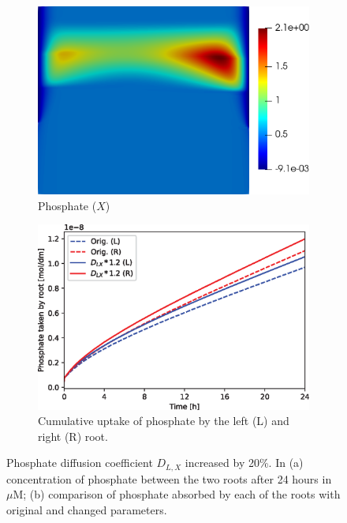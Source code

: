 \documentclass[11pt]{article}
\numberwithin{equation}{section}
\begin{document}
\begin{figure}[!htb]
\centering
\begin{subfigure}[t]{0.35\textwidth}
    \includegraphics[width=\textwidth]{Figures/X_DXup20.png}
    \caption{Phosphate ($X$)}
    \label{fig:numexp_DLXup1}
\end{subfigure}
\qquad
\begin{subfigure}[t]{0.4\textwidth}
    \includegraphics[width=\textwidth]{Figures/DXup20.eps}
    \caption{Cumulative uptake of phosphate by the left (L) and right (R) root.}
    \label{fig:numexp_DLXup2}
\end{subfigure}

\caption{Phosphate diffusion coefficient $D_{L,X}$ increased by 20\%. In (a) concentration of phosphate between the two roots after 24 hours in $\mu$M; (b) comparison of phosphate absorbed by each of the roots with original and changed parameters.}
\label{fig:numexp_DLXup}
\end{figure}
\end{document}
